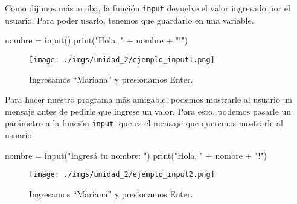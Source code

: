 \documentclass[
  letterpaper,
  DIV=11,
  numbers=noendperiod]{scrreprt}
\newenvironment{Shaded}{\begin{snugshade}}{\end{snugshade}}
\newcommand{\BuiltInTok}[1]{\textcolor[rgb]{0.00,0.23,0.31}{#1}}
\newcommand{\NormalTok}[1]{\textcolor[rgb]{0.00,0.23,0.31}{#1}}
\newcommand{\OperatorTok}[1]{\textcolor[rgb]{0.37,0.37,0.37}{#1}}
\newcommand{\StringTok}[1]{\textcolor[rgb]{0.13,0.47,0.30}{#1}}
\begin{document}
Como dijimos más arriba, la función \texttt{input} devuelve el valor
ingresado por el usuario. Para poder usarlo, tenemos que guardarlo en
una variable.

\begin{Shaded}
\begin{Highlighting}[]
\NormalTok{nombre }\OperatorTok{=} \BuiltInTok{input}\NormalTok{()}
\BuiltInTok{print}\NormalTok{(}\StringTok{"Hola, "} \OperatorTok{+}\NormalTok{ nombre }\OperatorTok{+} \StringTok{"!"}\NormalTok{)}
\end{Highlighting}
\end{Shaded}

\begin{figure}[H]

{\centering \texttt{[image: ./imgs/unidad\_2/ejemplo\_input1.png]}

}

\caption{Ingresamos ``Mariana'' y presionamos Enter.}

\end{figure}%

Para hacer nuestro programa más amigable, podemos mostrarle al usuario
un mensaje antes de pedirle que ingrese un valor. Para esto, podemos
pasarle un parámetro a la función \texttt{input}, que es el mensaje que
queremos mostrarle al usuario.

\begin{Shaded}
\begin{Highlighting}[]
\NormalTok{nombre }\OperatorTok{=} \BuiltInTok{input}\NormalTok{(}\StringTok{"Ingresá tu nombre: "}\NormalTok{)}
\BuiltInTok{print}\NormalTok{(}\StringTok{"Hola, "} \OperatorTok{+}\NormalTok{ nombre }\OperatorTok{+} \StringTok{"!"}\NormalTok{)}
\end{Highlighting}
\end{Shaded}

\begin{figure}[H]

{\centering \texttt{[image: ./imgs/unidad\_2/ejemplo\_input2.png]}

}

\caption{Ingresamos ``Mariana'' y presionamos Enter.}

\end{figure}%
\end{document}
